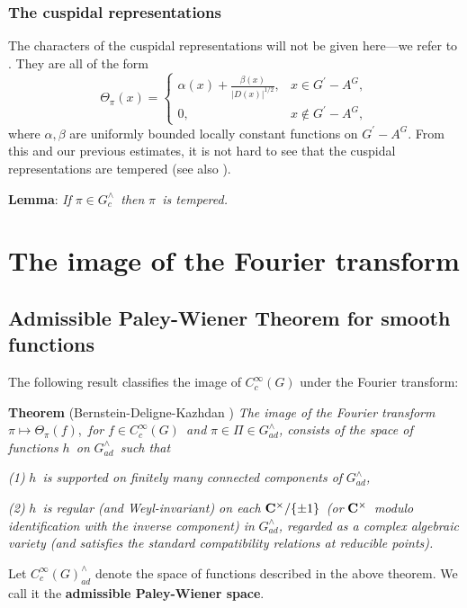 \documentclass[11pt, a4paper]{article}
\begin{document}
\subsubsection{The cuspidal representations}

The characters of the cuspidal representations will not be given here---we
refer to \cite{SS2}. They are all of the form
\[
\Theta _\pi (x)=\left\{ 
\begin{array}{ll}
\alpha (x)+ \frac{\beta (x)}{|D(x)|^{1/2}}, & x\in G^{\prime }-A^G, \\ 
0, & x\notin G^{\prime }-A^G,
\end{array}
\right.
\]
where $\alpha ,\beta $ are uniformly bounded locally constant functions on $%
G^{\prime }-A^G$. From this and our previous estimates, it is not hard to
see that the cuspidal representations are tempered (see also \cite[Theorem~4.5.1, Theorem~4.5.10]{S}).

{\bf Lemma}: {\em If }$\pi \in G_c^{\wedge }${\em \ then }$\pi ${\em \ is
tempered.}

\section{The image of the Fourier transform}

\subsection{Admissible Paley-Wiener Theorem for smooth functions}

The following result classifies the image of $C_c^\infty (G)$ under the
Fourier transform:

{\bf Theorem} (Bernstein-Deligne-Kazhdan \cite{BDK}) {\em The image of the Fourier
transform }$\pi \longmapsto \Theta _\pi (f)$,{\em \ for }$f\in C_c^\infty
(G)${\em \ and }$\pi \in \Pi \in G_{ad}^{\wedge }${\em , consists of the
space of functions }$h${\em \ on }$G_{ad}^{\wedge }${\em \ such that}

{\em (1) }$h${\em \ is supported on finitely many connected components of }$%
G_{ad}^{\wedge }${\em ,}

{\em (2) }$h${\em \ is regular (and Weyl-invariant) on each }${\bf C}^{\times }/\{\pm 1\}${\em \ (or }${\bf C}^{\times }${\em \ modulo identification with the inverse component) in }$G_{ad}^{\wedge }${\em , regarded as a complex algebraic variety (and satisfies the standard compatibility relations at reducible points).}

Let $C_c^\infty (G)_{ad}^{\wedge }$ denote the space of functions described
in the above theorem. We call it the {\bf admissible Paley-Wiener space}.
\end{document}
